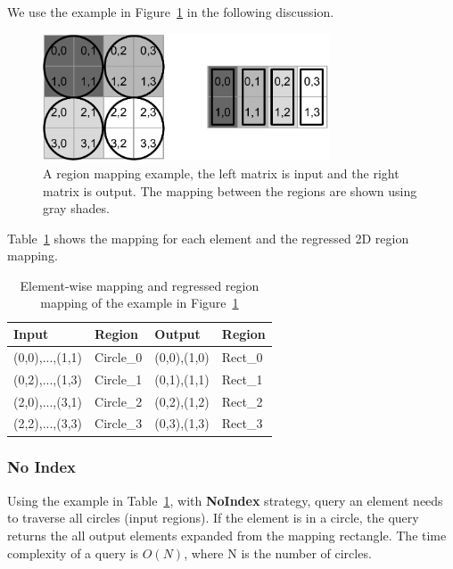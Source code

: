 \documentclass{sig-alternate}
\begin{document}
We use the example in Figure~\ref{fig:example} in the following discussion.
\begin{figure}[h]
\begin{center}
    \includegraphics[width=85mm]{pictures/example}
\caption {A region mapping example, the left matrix is input and the right matrix is output. The mapping between the regions are shown using gray shades.
    \label{fig:example}
}
\end{center}
\end{figure}

Table~\ref{tb:example} shows the mapping for each element and the regressed 2D region mapping.
\begin{table}[ht]
\begin{center}
    \caption{Element-wise mapping and regressed region mapping of the example in Figure~\ref{fig:example}}
    \begin{scriptsize}
    \begin{tabular}{ | p{1.75cm} | p{1.75cm} | p{1.75cm} | p{1.75cm} |}
    \hline
    Input & Region & Output & Region \\ \hline \hline
    (0,0),...,(1,1) & Circle\_0 & (0,0),(1,0) & Rect\_0 \\ \hline
    (0,2),...,(1,3) & Circle\_1 & (0,1),(1,1) & Rect\_1 \\ \hline
    (2,0),...,(3,1) & Circle\_2 & (0,2),(1,2) & Rect\_2 \\ \hline
    (2,2),...,(3,3) & Circle\_3 & (0,3),(1,3) & Rect\_3 \\ \hline
    \end{tabular}
    \end{scriptsize}
    \label{tb:example}
\end{center}   
\end{table} 

\subsubsection{No Index}
Using the example in Table~\ref{tb:example}, with {\bf NoIndex} strategy, query an element needs to traverse all circles (input regions).
If the element is in a circle, the query returns the all output elements expanded from the mapping rectangle.
The time complexity of a query is $O(N)$, where N is the number of circles. 
\end{document}
